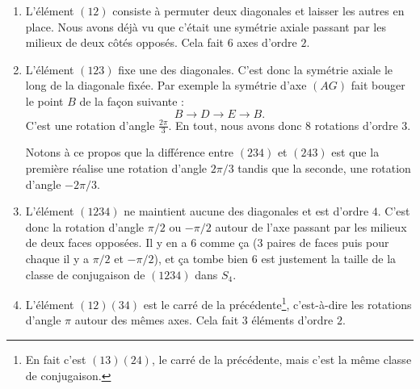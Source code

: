 \begin{enumerate}
	\item
	      L'élément \( (12)\) consiste à permuter deux diagonales et laisser les autres en place. Nous avons déjà vu que c'était une symétrie axiale passant par les milieux de deux côtés opposés. Cela fait \( 6\) axes d'ordre \( 2\).
	\item
	      L'élément \( (123)\) fixe une des diagonales. C'est donc la symétrie axiale le long de la diagonale fixée. Par exemple la symétrie d'axe \( (AG)\) fait bouger le point \( B\) de la façon suivante :
	      \begin{equation}
		      B\to D\to E\to B.
	      \end{equation}
	      C'est une rotation d'angle \( \frac{ 2\pi }{ 3 }\). En tout, nous avons donc \( 8\) rotations d'ordre \( 3\).

	      Notons à ce propos que la différence entre \( (234)\) et \( (243)\) est que la première réalise une rotation d'angle \( 2\pi/3\) tandis que la seconde, une rotation d'angle \( -2\pi/3\).

	\item
	      L'élément \( (1234)\) ne maintient aucune des diagonales et est d'ordre \( 4\). C'est donc la rotation d'angle \( \pi/2\) ou \( -\pi/2\) autour de l'axe passant par les milieux de deux faces opposées. Il y en a \( 6\) comme ça (\( 3\) paires de faces puis pour chaque il y a \( \pi/2\) et \( -\pi/2\)), et ça tombe bien \( 6\) est justement la taille de la classe de conjugaison de \( (1234)\) dans \( S_4\).

	\item
	      L'élément \( (12)(34)\) est le carré de la précédente\footnote{En fait c'est \( (13)(24)\), le carré de la précédente, mais c'est la même classe de conjugaison.}, c'est-à-dire les rotations d'angle \( \pi\) autour des mêmes axes. Cela fait \( 3\) éléments d'ordre \( 2\).

\end{enumerate}
